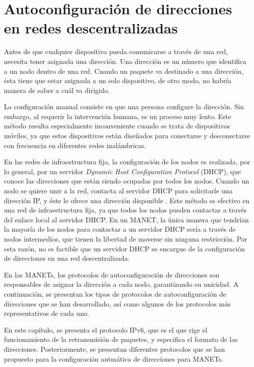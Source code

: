 ﻿%
\chapter{Autoconfiguración de direcciones en redes descentralizadas}

\label{ch:autoconfiguracion_de_direcciones_en_redes_descentralizadas}

Antes de que cualquier dispositivo pueda comunicarse a través de una red,
necesita tener asignada una dirección. Una dirección es un número que identifica
a un nodo dentro de una red. Cuando un paquete va destinado a una dirección,
ésta tiene que estar asignada a un solo dispositivo, de otro modo, no habría
manera de saber a cuál va dirigido.

La configuración manual consiste en que una persona configure la dirección.
Sin embargo, al requerir la intervención humana, es un proceso muy lento.
Este método resulta especialmente inconveniente cuando se trata de dispositivos
móviles, ya que estos dispositivos están diseñados para conectarse y
desconectarse con frecuencia en diferentes redes inalámbricas.

En las redes de infraestructura fija, la configuración de los nodos es
realizada, por lo general, por un servidor \textit{Dynamic Host Configuration
Protocol} (DHCP), que conoce las direcciones que están siendo ocupadas por todos
los nodos. Cuando un nodo se quiere unir a la red, contacta al servidor DHCP para
solicitarle una dirección IP, y éste le ofrece una dirección disponible
\cite{Kurose2013}. Este método es efectivo en una red de infraestructura fija,
ya que todos los nodos pueden contactar a través del enlace local al servidor
DHCP. En un MANET, la única manera que tendrían la mayoría de los nodos para
contactar a un servidor DHCP sería a través de nodos intermedios, que tienen la
libertad de moverse sin ninguna restricción. Por esta razón, no es factible que
un servidor DHCP se encargue de la configuración de direcciones en una red
descentralizada.

En las MANETs, los protocolos de autoconfiguración de direcciones son
responsables de asignar la dirección a cada nodo, garantizando su unicidad. A
continuación, se presentan los tipos de protocolos de autoconfiguración de
direcciones que se han desarrollado, así como algunos de los protocolos más
representativos de cada uno.

En este capítulo, se presenta el protocolo IPv6, que es el que rige el
funcionamiento de la retransmisión de paquetes, y especifica el formato de las
direcciones. Posteriormente, se presentan diferentes protocolos que se han
propuesto para la configuración autmática de direcciones para MANETs.

